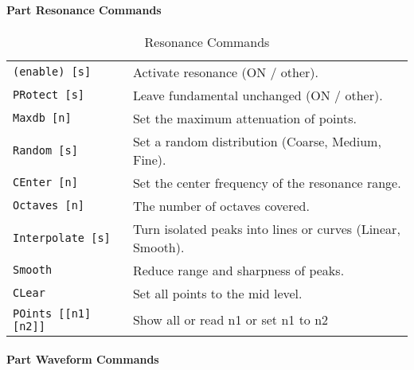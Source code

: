 \begin{table}[H]
\begin{tabular}{l l}
      \end{tabular}
   \end{table}

\paragraph{Part Resonance Commands}
\label{paragraph:command_line_part_resonance_commands}

   \begin{table}[H]
      \centering
      \caption{Resonance Commands}
      \label{table:part_resonance_commands}
      \begin{tabular}{l l}

   \texttt{(enable) [s]} &
      Activate resonance (ON / other). \\
    \texttt{PRotect [s]} &
      Leave fundamental unchanged (ON / other). \\
   \texttt{Maxdb [n]} &
      Set the maximum attenuation of points. \\
   \texttt{Random [s]} &
      Set a random distribution (Coarse, Medium, Fine). \\
   \texttt{CEnter [n]} &
      Set the center frequency of the resonance range. \\
   \texttt{Octaves [n]} &
      The number of octaves covered. \\
   \texttt{Interpolate [s]} &
      Turn isolated peaks into lines or curves (Linear, Smooth). \\
   \texttt{Smooth} &
      Reduce range and sharpness of peaks. \\
   \texttt{CLear} &
      Set all points to the mid level. \\
   \texttt{POints [[n1] [n2]]} &
      Show all or read n1 or set n1 to n2 \\

      \end{tabular}
   \end{table}

\paragraph{Part Waveform Commands}
\label{paragraph:command_line_part_waveform_commands}

